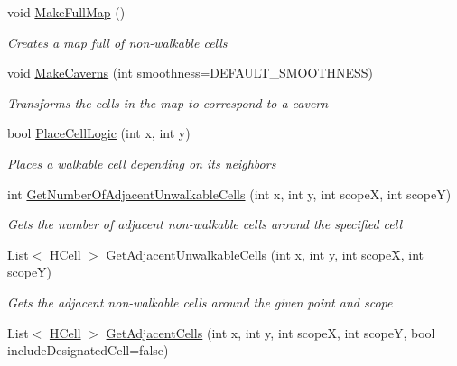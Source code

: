 \begin{DoxyCompactItemize}
void \hyperlink{class_hel_project_1_1_game_world_1_1_map_1_1_h_map_a644aff42a105d8b2b7a9ad0aa4d9ac94}{Make\+Full\+Map} ()
\begin{DoxyCompactList}\small\item\em Creates a map full of non-\/walkable cells \end{DoxyCompactList}\item 
void \hyperlink{class_hel_project_1_1_game_world_1_1_map_1_1_h_map_a338b82cacb27f45c792f090e6bfc12fe}{Make\+Caverns} (int smoothness=D\+E\+F\+A\+U\+L\+T\+\_\+\+S\+M\+O\+O\+T\+H\+N\+E\+S\+S)
\begin{DoxyCompactList}\small\item\em Transforms the cells in the map to correspond to a cavern \end{DoxyCompactList}\item 
bool \hyperlink{class_hel_project_1_1_game_world_1_1_map_1_1_h_map_a31940bf039491720aed68ac056868f2a}{Place\+Cell\+Logic} (int x, int y)
\begin{DoxyCompactList}\small\item\em Places a walkable cell depending on it\textquotesingle{}s neighbors \end{DoxyCompactList}\item 
int \hyperlink{class_hel_project_1_1_game_world_1_1_map_1_1_h_map_ac11321d7ff766f5ff1a57bfc941d721e}{Get\+Number\+Of\+Adjacent\+Unwalkable\+Cells} (int x, int y, int scope\+X, int scope\+Y)
\begin{DoxyCompactList}\small\item\em Gets the number of adjacent non-\/walkable cells around the specified cell \end{DoxyCompactList}\item 
List$<$ \hyperlink{class_hel_project_1_1_game_world_1_1_map_1_1_h_cell}{H\+Cell} $>$ \hyperlink{class_hel_project_1_1_game_world_1_1_map_1_1_h_map_a8fe60c382ebc4b0cb407e8e318c08d8b}{Get\+Adjacent\+Unwalkable\+Cells} (int x, int y, int scope\+X, int scope\+Y)
\begin{DoxyCompactList}\small\item\em Gets the adjacent non-\/walkable cells around the given point and scope \end{DoxyCompactList}\item 
List$<$ \hyperlink{class_hel_project_1_1_game_world_1_1_map_1_1_h_cell}{H\+Cell} $>$ \hyperlink{class_hel_project_1_1_game_world_1_1_map_1_1_h_map_a45d1bd903b1626f6f968d53e6861847b}{Get\+Adjacent\+Cells} (int x, int y, int scope\+X, int scope\+Y, bool include\+Designated\+Cell=false)

\end{DoxyCompactItemize}

